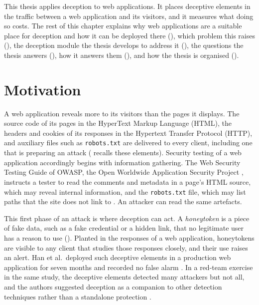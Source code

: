 \documentclass{rptuma}
\begin{document}
This thesis applies deception to web applications. It places deceptive elements in the traffic
between a web application and its visitors, and it measures what doing so costs. The rest of this
chapter explains why web applications are a suitable place for deception and how it can be
deployed there (), which problem this raises
(), the deception module the thesis develops to address it
(), the questions the thesis answers (), how
it answers them (), and how the thesis is organised
().

\section{Motivation}
\label{sec:intro.motivation}

A web application reveals more to its visitors than the pages it displays. The source code of its
pages in the HyperText Markup Language (HTML), the headers and cookies of its responses in the
Hypertext Transfer Protocol (HTTP), and auxiliary files such as \texttt{robots.txt} are delivered
to every client, including one that is preparing an attack ( recalls these
elements). Security testing of a web application accordingly begins with information gathering.
The Web Security Testing Guide of OWASP, the Open Worldwide Application Security Project
\cite{owasp_about}, instructs a tester to read the comments and metadata in a page's HTML source,
which may reveal internal information, and the \texttt{robots.txt} file, which may list paths that
the site does not link to \cite{owasp2020wstg}. An attacker can read the same artefacts.

This first phase of an attack is where deception can act. A \emph{honeytoken} is a piece of fake
data, such as a fake credential or a hidden link, that no legitimate user has a reason to use
(). Planted in the responses of a web application, honeytokens are
visible to any client that studies those responses closely, and their use raises an alert. Han et
al.\ deployed such deceptive elements in a production web application for seven months and recorded
no false alarm \cite{han2017evaluation}. In a red-team exercise in the same study, the deceptive
elements detected many attackers but not all, and the authors suggested deception as a companion to
other detection techniques rather than a standalone protection \cite{han2017evaluation}.
\end{document}
